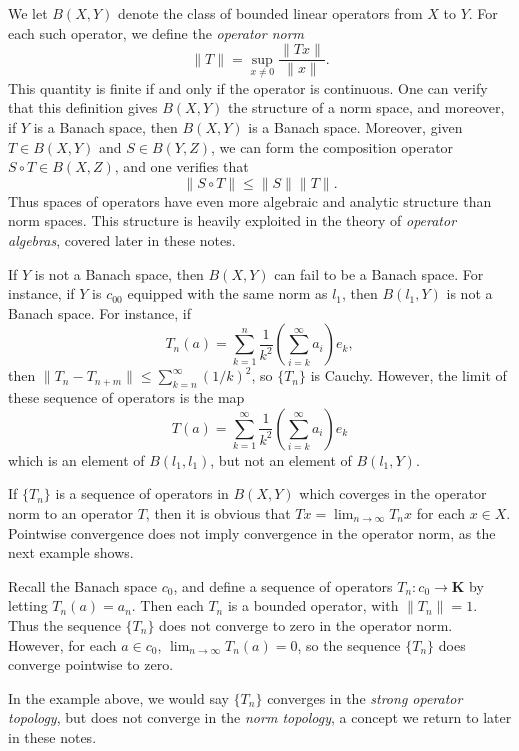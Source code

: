 We let $B(X,Y)$ denote the class of bounded linear operators from $X$ to $Y$. For each such operator, we define the {\it operator norm}
%
\[ \| T \| = \sup_{x \neq 0} \frac{\| Tx \|}{\| x \|}. \]
%
This quantity is finite if and only if the operator is continuous. One can verify that this definition gives $B(X,Y)$ the structure of a norm space, and moreover, if $Y$ is a Banach space, then $B(X,Y)$ is a Banach space. Moreover, given $T \in B(X,Y)$ and $S \in B(Y,Z)$, we can form the composition operator $S \circ T \in B(X,Z)$, and one verifies that
%
\[ \| S \circ T \| \leq \| S \| \| T \|. \]
%
Thus spaces of operators have even more algebraic and analytic structure than norm spaces. This structure is heavily exploited in the theory of {\it operator algebras}, covered later in these notes.

\begin{example}
    If $Y$ is not a Banach space, then $B(X,Y)$ can fail to be a Banach space. For instance, if $Y$ is $c_{00}$ equipped with the same norm as $l_1$, then $B(l_1,Y)$ is not a Banach space. For instance, if
    \[ T_n(a) = \sum_{k = 1}^n \frac{1}{k^2} \left( \sum_{i = k}^\infty a_i \right) e_k, \]
    then $\| T_n - T_{n + m} \| \leq \sum_{k = n}^\infty (1/k)^2$, so $\{ T_n \}$ is Cauchy. However, the limit of these sequence of operators is the map
    \[ T(a) = \sum_{k = 1}^\infty \frac{1}{k^2} \left( \sum_{i = k}^\infty a_i \right) e_k \]
    which is an element of $B(l_1,l_1)$, but not an element of $B(l_1,Y)$.
\end{example}

If $\{ T_n \}$ is a sequence of operators in $B(X,Y)$ which coverges in the operator norm to an operator $T$, then it is obvious that $Tx = \lim_{n \to \infty} T_nx$ for each $x \in X$. Pointwise convergence does not imply convergence in the operator norm, as the next example shows.

\begin{example}
    Recall the Banach space $c_0$, and define a sequence of operators $T_n: c_0 \to \mathbf{K}$ by letting $T_n(a) = a_n$. Then each $T_n$ is a bounded operator, with $\| T_n \| = 1$. Thus the sequence $\{ T_n \}$ does not converge to zero in the operator norm. However, for each $a \in c_0$, $\lim_{n \to \infty} T_n(a) = 0$, so the sequence $\{ T_n \}$ does converge pointwise to zero.
\end{example}

In the example above, we would say $\{ T_n \}$ converges in the \emph{strong operator topology}, but does not converge in the \emph{norm topology}, a concept we return to later in these notes.

